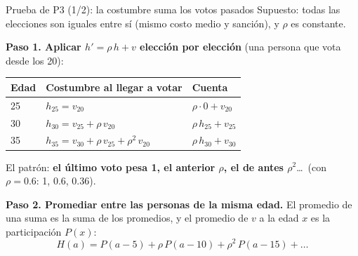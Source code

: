 \documentclass[aspectratio=169,11pt,xcolor=table]{beamer}
\newcommand{\1}{\mathbbm{1}}
\begin{document}
\begin{frame}{Prueba de P3 (1/2): la costumbre suma los votos pasados}
  \small Supuesto: todas las elecciones son iguales entre sí (mismo costo medio y sanción), y $\rho$ es constante.

  \textbf{Paso 1. Aplicar $h'=\rho\,h+v$ elección por elección} (una persona que vota desde los 20):
  {\footnotesize
  \renewcommand{\arraystretch}{1.15}
  \begin{center}
  \begin{tabular}{@{}lll@{}}
    \toprule
    Edad & Costumbre al llegar a votar & Cuenta \\
    \midrule
    25 & $h_{25}=v_{20}$ & $\rho\cdot0+v_{20}$ \\
    30 & $h_{30}=v_{25}+\rho\,v_{20}$ & $\rho\,h_{25}+v_{25}$ \\
    35 & $h_{35}=v_{30}+\rho\,v_{25}+\rho^2\,v_{20}$ & $\rho\,h_{30}+v_{30}$ \\
    \bottomrule
  \end{tabular}
  \end{center}}
  \vspace{-0.1cm}
  El patrón: \textbf{el último voto pesa 1, el anterior $\rho$, el de antes $\rho^2$}\dots\ (con $\rho=0.6$: 1, 0.6, 0.36).

  \vspace{0.15cm}
  \textbf{Paso 2. Promediar entre las personas de la misma edad.} El promedio de una suma es la suma de los promedios,
  y el promedio de $v$ a la edad $x$ es la participación $P(x)$:
  \[ H(a)=P(a-5)+\rho\,P(a-10)+\rho^2\,P(a-15)+\dots \]
\end{frame}
\end{document}
